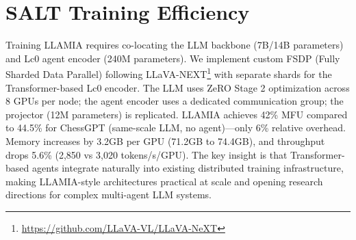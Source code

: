 \section{SALT Training Efficiency}
\label{sec:fsdp_impl}


Training LLAMIA requires co-locating the LLM backbone (7B/14B parameters) and Lc0 agent encoder (240M parameters). We implement custom FSDP (Fully Sharded Data Parallel) following LLaVA-NEXT\footnote{\url{https://github.com/LLaVA-VL/LLaVA-NeXT}} with separate shards for the Transformer-based Lc0 encoder. The LLM uses ZeRO Stage 2 optimization across 8 GPUs per node; the agent encoder uses a dedicated communication group; the projector (12M parameters) is replicated. LLAMIA achieves 42\% MFU compared to 44.5\% for ChessGPT (same-scale LLM, no agent)---only 6\% relative overhead. Memory increases by 3.2GB per GPU (71.2GB to 74.4GB), and throughput drops 5.6\% (2,850 vs 3,020 tokens/s/GPU). The key insight is that Transformer-based agents integrate naturally into existing distributed training infrastructure, making LLAMIA-style architectures practical at scale and opening research directions for complex multi-agent LLM systems.
